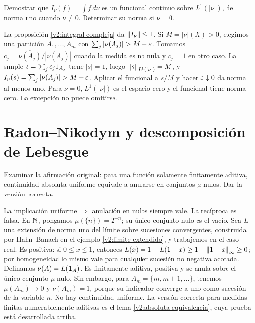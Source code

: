 \begin{ejercicio}\label{ej:v2-l26-2}
Demostrar que $I_\nu(f)=\int f\,d\nu$ es un funcional continuo sobre $L^1(|\nu|)$, de norma uno cuando $\nu\ne0$. Determinar su norma si $\nu=0$.
\end{ejercicio}
\begin{solucion}
La proposición \ref{v2:integral-compleja} da $\left\lVert I_\nu\right\rVert\le1$. Si $M=|\nu|(X)>0$, elegimos una partición $A_1,\ldots,A_m$ con $\sum_j|\nu(A_j)|>M-\eps$. Tomamos $c_j=\overline{\nu(A_j)}/|\nu(A_j)|$ cuando la medida es no nula y $c_j=1$ en otro caso. La simple $s=\sum_jc_j\mathbf1_{A_j}$ tiene $|s|=1$, luego $\left\lVert s\right\rVert_{L^1(|\nu|)}=M$, y $I_\nu(s)=\sum_j|\nu(A_j)|>M-\eps$. Aplicar el funcional a $s/M$ y hacer $\varepsilon\downarrow0$ da norma al menos uno. Para $\nu=0$, $L^1(|\nu|)$ es el espacio cero y el funcional tiene norma cero. La excepción no puede omitirse.
\end{solucion}

\chapter{Radon--Nikodym y descomposición de Lebesgue}

\begin{ejercicio}\label{ej:v2-l27-1}
Examinar la afirmación original: para una función solamente finitamente aditiva, continuidad absoluta uniforme equivale a anularse en conjuntos $\mu$-nulos. Dar la versión correcta.
\end{ejercicio}
\begin{solucion}
La implicación uniforme $\Rightarrow$ anulación en nulos siempre vale. La recíproca es falsa. En $\mathbb N$, pongamos $\mu(\{n\})=2^{-n}$; su único conjunto nulo es el vacío. Sea $L$ una extensión de norma uno del límite sobre sucesiones convergentes, construida por Hahn--Banach en el ejemplo \ref{v2:limite-extendido}, y trabajemos en el caso real. Es positiva: si $0\le x\le1$, entonces $L(x)=1-L(1-x)\ge1-\left\lVert1-x\right\rVert_\infty\ge0$; por homogeneidad lo mismo vale para cualquier sucesión no negativa acotada. Definamos $\nu(A)=L(\mathbf1_{A})$. Es finitamente aditiva, positiva y se anula sobre el único conjunto $\mu$-nulo. Sin embargo, para $A_m=\{m,m+1,\ldots\}$, tenemos $\mu(A_m)\to0$ y $\nu(A_m)=1$, porque su indicador converge a uno como sucesión de la variable $n$. No hay continuidad uniforme. La versión correcta para medidas finitas numerablemente aditivas es el lema \ref{v2:absoluta-equivalencia}, cuya prueba está desarrollada arriba.
\end{solucion}

